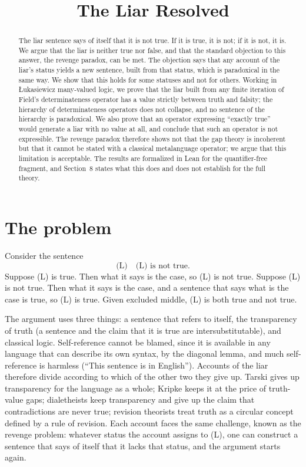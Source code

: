 \documentclass{situationist-preprint}
\title{The Liar Resolved}
\begin{document}
\maketitle

\begin{abstract}
The liar sentence says of itself that it is not true. If it is true, it is not; if it is not, it is. We argue that the liar is neither true nor false, and that the standard objection to this answer, the revenge paradox, can be met. The objection says that any account of the liar's status yields a new sentence, built from that status, which is paradoxical in the same way. We show that this holds for some statuses and not for others. Working in Łukasiewicz many-valued logic, we prove that the liar built from any finite iteration of Field's determinateness operator has a value strictly between truth and falsity; the hierarchy of determinateness operators does not collapse, and no sentence of the hierarchy is paradoxical. We also prove that an operator expressing \enquote{exactly true} would generate a liar with no value at all, and conclude that such an operator is not expressible. The revenge paradox therefore shows not that the gap theory is incoherent but that it cannot be stated with a classical metalanguage operator; we argue that this limitation is acceptable. The results are formalized in Lean for the quantifier-free fragment, and Section~8 states what this does and does not establish for the full theory.
\end{abstract}

\section{The problem}

Consider the sentence
\begin{equation}\label{e:liar}
\text{(L)}\quad \text{(L) is not true.}
\end{equation}
Suppose (L) is true. Then what it says is the case, so (L) is not true. Suppose (L) is not true. Then what it says is the case, and a sentence that says what is the case is true, so (L) is true. Given excluded middle, (L) is both true and not true.

The argument uses three things: a sentence that refers to itself, the transparency of truth (a sentence and the claim that it is true are intersubstitutable), and classical logic. Self-reference cannot be blamed, since it is available in any language that can describe its own syntax, by the diagonal lemma, and much self-reference is harmless (\enquote{This sentence is in English}). Accounts of the liar therefore divide according to which of the other two they give up. Tarski gives up transparency for the language as a whole; Kripke keeps it at the price of truth-value gaps; dialetheists keep transparency and give up the claim that contradictions are never true; revision theorists treat truth as a circular concept defined by a rule of revision. Each account faces the same challenge, known as the revenge problem: whatever status the account assigns to (L), one can construct a sentence that says of itself that it lacks that status, and the argument starts again.
\end{document}
